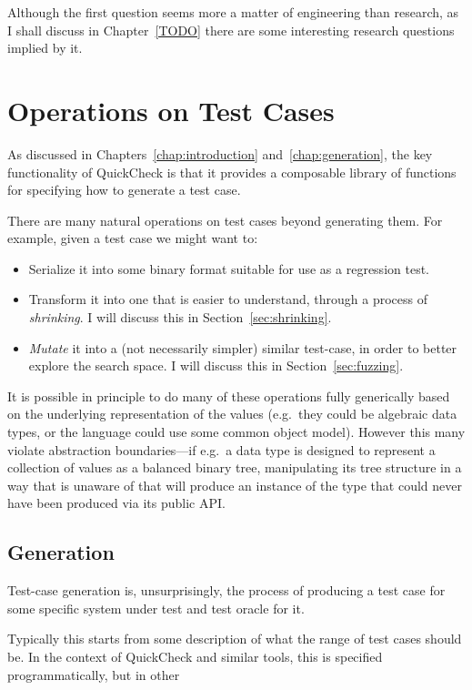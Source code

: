 Although the first question seems more a matter of engineering than research,
as I shall discuss in Chapter~\ref{TODO} there are some interesting research questions implied by it.

\chapter{Operations on Test Cases}

As discussed in Chapters~\ref{chap:introduction} and~\ref{chap:generation},
the key functionality of QuickCheck is that it provides a composable library of functions for specifying how to generate a test case.

There are many natural operations on test cases beyond generating them.
For example,
given a test case we might want to:

\begin{itemize}
\item Serialize it into some binary format suitable for use as a regression test.
\item Transform it into one that is easier to understand,
through a process of \emph{shrinking}.
I will discuss this in Section~\ref{sec:shrinking}.
\item \emph{Mutate} it into a (not necessarily simpler) similar test-case,
in order to better explore the search space. I will discuss this in Section~\ref{sec:fuzzing}.
\end{itemize}

It is possible in principle to do many of these operations fully generically based on the underlying representation of the values (e.g.~they could be algebraic data types,
or the language could use some common object model).
However this many violate abstraction boundaries---if
e.g.\ a data type is designed to represent a collection of values as a balanced binary tree,
manipulating its tree structure in a way that is unaware of that will produce an instance of the type that could never have been produced via its public API.\ 

\section{Generation}

Test-case generation is,
unsurprisingly,
the process of producing a test case for some specific system under test and test oracle for it.

Typically this starts from some description of what the range of test cases should be.
In the context of QuickCheck and similar tools,
this is specified programmatically,
but in other

